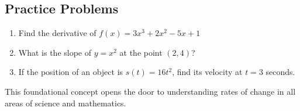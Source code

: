 \documentclass{article}
\begin{document}
\subsection{Practice Problems}

\begin{enumerate}
    \item Find the derivative of $f(x) = 3x^3 + 2x^2 - 5x + 1$
    \item What is the slope of $y = x^2$ at the point $(2, 4)$?
    \item If the position of an object is $s(t) = 16t^2$, find its velocity at $t = 3$ seconds.
\end{enumerate}

This foundational concept opens the door to understanding rates of change in all areas of science and mathematics.
\end{document}
